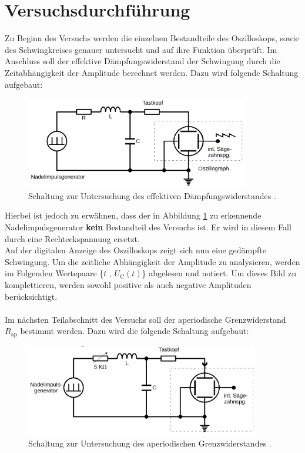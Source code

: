 %

%
\section{Versuchsdurchführung}

Zu Beginn des Versuchs werden die einzelnen Bestandteile des Oszilloskops, sowie des Schwingkreises genauer untersucht 
und auf ihre Funktion überprüft. Im Anschluss soll der effektive Dämpfungswiderstand der Schwingung durch die 
Zeitabhängigkeit der Amplitude berechnet werden. Dazu wird folgende Schaltung aufgebaut:

\begin{figure}
    \centering
    \includegraphics[height=4cm]{./content/5a.png}
    \caption{Schaltung zur Untersuchung des effektiven Dämpfungswiderstandes \cite{Versuchsanleitung_v354}.}
    \label{fig:5a}
\end{figure}

\noindent Hierbei ist jedoch zu erwähnen, dass der in Abbildung \ref{fig:5a} zu erkennende Nadelimpulsgenerator \textbf{kein}
Bestandteil des Versuchs ist. Er wird in diesem Fall durch eine Rechteckspannung ersetzt.\\
Auf der digitalen Anzeige des Oszilloskops zeigt sich nun eine gedämpfte Schwingung. Um die zeitliche Abhängigkeit der Amplitude 
zu analysieren, werden im Folgenden Wertepaare \{$t$ , $U_\text{C}(t)$\} abgelesen und notiert. Um dieses Bild zu komplettieren, 
werden sowohl positive als auch negative Amplituden berücksichtigt.\\\\

\noindent Im nächsten Teilabschnitt des Versuchs soll der aperiodische Grenzwiderstand $R_\text{ap}$ bestimmt werden. Dazu wird 
die folgende Schaltung aufgebaut:

\begin{figure}[H]
    \centering
    \includegraphics[height=4cm]{./content/5b.png}
    \caption{Schaltung zur Untersuchung des aperiodischen Grenzwiderstandes \cite{Versuchsanleitung_v354}.}
    \label{fig:5b}
\end{figure}

